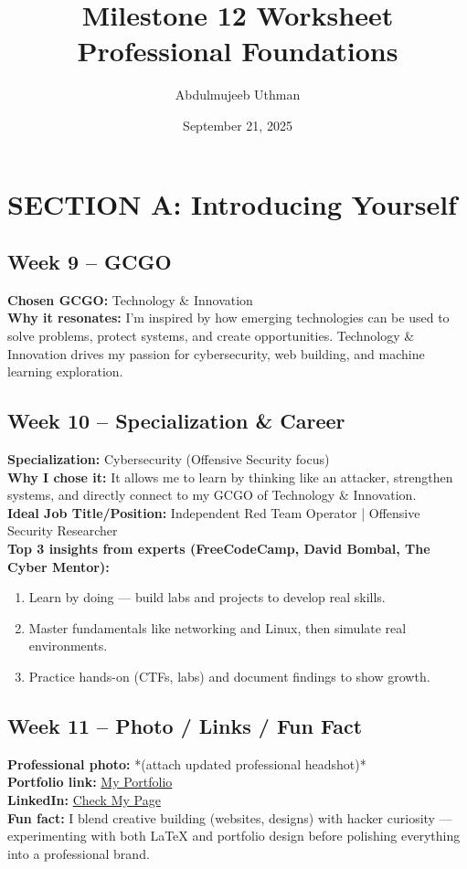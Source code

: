 \documentclass[12pt,a4paper]{article}
\title{\textbf{Milestone 12 Worksheet}\\Professional Foundations}
\author{Abdulmujeeb Uthman}
\date{September 21, 2025}
\begin{document}
\maketitle

\section*{SECTION A: Introducing Yourself}

\subsection*{Week 9 – GCGO}
\textbf{Chosen GCGO:} Technology \& Innovation \\
\textbf{Why it resonates:} I’m inspired by how emerging technologies can be used to solve problems, protect systems, and create opportunities. Technology \& Innovation drives my passion for cybersecurity, web building, and machine learning exploration.

\subsection*{Week 10 – Specialization \& Career}
\textbf{Specialization:} Cybersecurity (Offensive Security focus) \\
\textbf{Why I chose it:} It allows me to learn by thinking like an attacker, strengthen systems, and directly connect to my GCGO of Technology \& Innovation. \\
\textbf{Ideal Job Title/Position:} Independent Red Team Operator | Offensive Security Researcher \\
\textbf{Top 3 insights from experts (FreeCodeCamp, David Bombal, The Cyber Mentor):}
\begin{enumerate}
    \item Learn by doing --- build labs and projects to develop real skills.
    \item Master fundamentals like networking and Linux, then simulate real environments.
    \item Practice hands-on (CTFs, labs) and document findings to show growth.
\end{enumerate}

\subsection*{Week 11 – Photo / Links / Fun Fact}
\textbf{Professional photo:} *(attach updated professional headshot)* \\
\textbf{Portfolio link:} \href{https://sites.google.com/view/abdulmujeeb-uthman}{My Portfolio} \\
\textbf{LinkedIn:} \href{https://www.linkedin.com/in/abdulmujeeb-uthman/}{Check My Page} \\
\textbf{Fun fact:} I blend creative building (websites, designs) with hacker curiosity — experimenting with both LaTeX and portfolio design before polishing everything into a professional brand.
\end{document}

